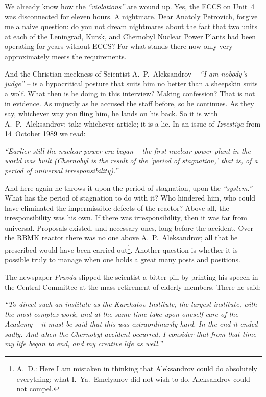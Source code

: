 \documentclass[openright]{bookest}
\begin{document}
We already know how the \textit{``violations''} are wound up. Yes, the ECCS on Unit~4 was disconnected for eleven hours. A nightmare. Dear Anatoly Petrovich, forgive me a naive question: do you not dream nightmares about the fact that two units at each of the Leningrad, Kursk, and Chernobyl Nuclear Power Plants had been operating for years without ECCS? For what stands there now only very approximately meets the requirements.

And the Christian meekness of Scientist A.~P.~Aleksandrov -- \textit{``I am nobody's judge''} -- is a hypocritical posture that suits him no better than a sheepskin suits a wolf. What then is he doing in this interview? Making confession? That is not in evidence. As unjustly as he accused the staff before, so he continues. As they say, whichever way you fling him, he lands on his back. So it is with A.~P.~Aleksandrov: take whichever article; it is a lie. In an issue of \textit{Izvestiya} from 14~October 1989 we read:

\begin{personal}
\textit{``Earlier still the nuclear power era began -- the first nuclear power plant in the world was built (Chernobyl is the result of the `period of stagnation,' that is, of a period of universal irresponsibility).''}
\end{personal}

And here again he throws it upon the period of stagnation, upon the \textit{``system.''} What has the period of stagnation to do with it? Who hindered him, who could have eliminated the impermissible defects of the reactor? Above all, the irresponsibility was his own. If there was irresponsibility, then it was far from universal. Proposals existed, and necessary ones, long before the accident. Over the RBMK reactor there was no one above A.~P.~Aleksandrov; all that he prescribed would have been carried out\footnote{A.~D.: Here I am mistaken in thinking that Aleksandrov could do absolutely everything: what I.~Ya.~Emelyanov did not wish to do, Aleksandrov could not compel.}. Another question is whether it is possible truly to manage when one holds a great many posts and positions.

The newspaper \textit{Pravda} slipped the scientist a bitter pill by printing his speech in the Central Committee at the mass retirement of elderly members. There he said:

\begin{personal}
\textit{``To direct such an institute as the Kurchatov Institute, the largest institute, with the most complex work, and at the same time take upon oneself care of the Academy -- it must be said that this was extraordinarily hard. In the end it ended sadly. And when the Chernobyl accident occurred, I consider that from that time my life began to end, and my creative life as well.''}
\end{personal}
\end{document}
